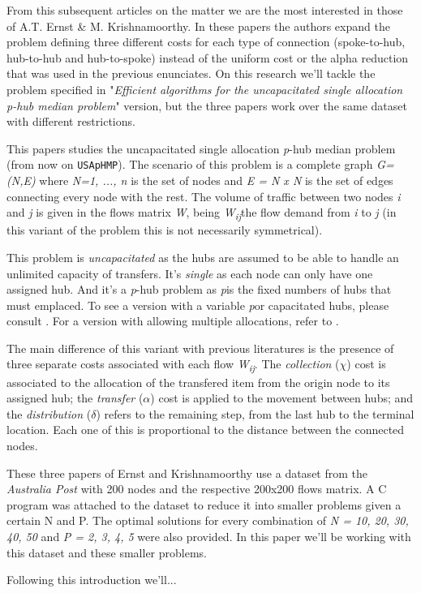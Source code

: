\documentclass[onecolumn]{IEEEtran}
\newcommand{\ip}{\emph{p}}
\newcommand{\wij}{\emph{W\textsubscript{ij}}}
\def\code#1{\texttt{#1}}
\begin{document}
From this subsequent articles on the matter we are the most interested in those of A.T. Ernst \&
M. Krishnamoorthy\cite{Ernst1996}\cite{Ernst1998}\cite{Ernst1999}. In these papers the authors expand
the problem defining three different costs for each type of connection (spoke-to-hub, hub-to-hub and
hub-to-spoke) instead of the uniform cost or the alpha reduction that was used in the previous
enunciates. On this research we'll tackle the problem specified in "\emph{Efficient algorithms for
the uncapacitated single allocation \ip-hub median problem}"\cite{Ernst1996} version, but the three
papers work over the same dataset with different restrictions.

This papers studies the uncapacitated single allocation \ip-hub median problem (from now on
\code{USApHMP}). The scenario of this problem is a complete graph \emph{G=(N,E)} where \emph{N={1, ..., n}} is
the set of nodes and \emph{E = N x N} is the set of edges connecting every node with the rest.
The volume of traffic between two nodes \emph{i} and \emph{j} is given in the flows matrix \emph{W}, 
being \wij the flow demand from \emph{i} to \emph{j} (in this variant of the problem this
is not necessarily symmetrical).

This problem is \emph{uncapacitated} as the hubs are assumed to be able to handle an unlimited
capacity of transfers. It's \emph{single} as each node can only have one assigned hub. And
it's a \ip-hub problem as \ip is the fixed numbers of hubs that must emplaced. To see a version
with a variable \ip or capacitated hubs, please consult \cite{Ernst1999}. For a version with 
allowing multiple allocations, refer to \cite{Ernst1998}.

The main difference of this variant with previous literatures is the presence of three separate
costs associated with each flow \wij. The \emph{collection} ($\chi$) cost is associated to the allocation 
of the transfered item from the origin node to its assigned hub; the \emph{transfer} ($\alpha$) cost is 
applied to the movement between hubs; and the \emph{distribution} ($\delta$) refers to the remaining step, 
from the last hub to the terminal location. Each one of this is proportional to the distance between 
the connected nodes.

These three papers of Ernst and Krishnamoorthy use a dataset from the \emph{Australia Post} with 200
nodes and the respective 200x200 flows matrix. A C program was attached to the dataset to reduce
it into smaller problems given a certain N and P. The optimal solutions for every combination of 
\emph{N = {10, 20, 30, 40, 50}} and \emph{P = {2, 3, 4, 5}} were also provided. In this paper we'll
be working with this dataset and these smaller problems.

Following this introduction we'll... %




\end{document}
